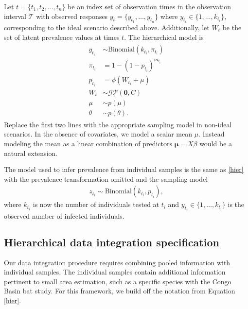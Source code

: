 \documentclass{article}
\begin{document}
Let $t = \{t_1, t_2, \dots, t_n\}$ be an index set of observation times in the observation interval $\mathcal{T}$ with observed responses $y_t = \{y_{t_1}, \dots, y_{t_n}\}$ where $y_{t_i}\in \{1,\dots,k_{t_i}\}$, corresponding to the ideal scenario described above. Additionally, let $W_t$ be the set of latent prevalence values at times $t$. The hierarchical model is
\begin{align}
\begin{split} \label{hier}
    y_{t_i} &\sim \text{Binomial}(k_{t_i}, \pi_{t_i}) \\
    \pi_{t_i} &= 1 - (1 - p_{t_i})^{m_{t_i}} \\
    p_{t_i} &= \phi(W_{t_i} + \mu) \\
    W_t &\sim \mathcal{GP}(\mathbf{0}, C) \\
    \mu &\sim p(\mu) \\
    \theta &\sim p(\theta).
\end{split}
\end{align}
Replace the first two lines with the appropriate sampling model in non-ideal scenarios. In the absence of covariates, we model a scalar mean $\mu$. Instead modeling the mean as a linear combination of predictors $\boldsymbol{\mu}= X\beta$ would be a natural extension. 

The model used to infer prevalence from individual samples is the same as \eqref{hier} with the prevalence transformation omitted and the sampling model
\begin{align*}
    z_{t_i} \sim \text{Binomial}(k_{t_i}, p_{t_i}),
\end{align*}
where $k_{t_i}$ is now the number of individuals tested at $t_i$ and $y_{t_i}\in \{1,\dots,k_{t_i}\}$ is the observed number of infected individuals. 

\subsection{Hierarchical data integration specification}

Our data integration procedure requires combining pooled information with individual samples. The individual samples contain additional information pertinent to small area estimation, such as a specific species with the Congo Basin bat study. For this framework, we build off the notation from Equation \ref{hier}.
\end{document}
